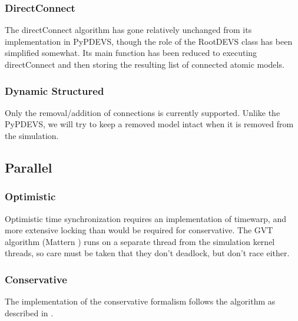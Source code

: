 \documentclass[8pt,a4paper]{report}
\begin{document}
\subsubsection{DirectConnect}
The directConnect algorithm has gone relatively unchanged from its implementation in PyPDEVS, though the role of the RootDEVS class has been simplified somewhat. Its main function has been reduced to executing directConnect and then storing the resulting list of connected atomic models.
\subsubsection{Dynamic Structured}
Only the removal/addition of connections is currently supported. Unlike the PyPDEVS, we will try to keep a removed model intact when it is removed from the simulation.
\subsection{Parallel}
\subsubsection{Optimistic}
Optimistic time synchronization requires an implementation of timewarp, and more extensive locking than would be required for conservative. The GVT algorithm (Mattern \cite{Mattern}) runs on a separate thread from the simulation kernel threads, so care must be taken that they don't deadlock, but don't race either.
\subsubsection{Conservative}
The implementation of the conservative formalism follows the algorithm as described in \cite{cons}. \\
\end{document}
